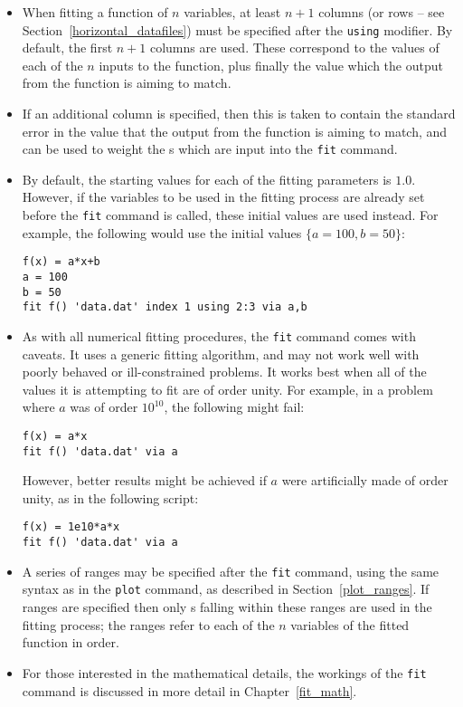 \begin{itemize}
\item When fitting a function of $n$ variables, at least $n+1$ columns (or
rows -- see Section~\ref{horizontal_datafiles}) must be specified after the
{\tt using} modifier. By default, the first $n+1$ columns are used. These
correspond to the values of each of the $n$ inputs to the function, plus
finally the value which the output from the function is aiming to match.
\item If an additional column is specified, then this is taken to contain the
standard error in the value that the output from the function is aiming to
match, and can be used to weight the \datapoint s which are input into the
{\tt fit} command. 
\item By default, the starting values for each of the fitting parameters is
$1.0$. However, if the variables to be used in the fitting process are already
set before the {\tt fit} command is called, these initial values are used
instead. For example, the following would use the initial values
$\{a=100,b=50\}$:
\begin{verbatim}
f(x) = a*x+b
a = 100
b = 50
fit f() 'data.dat' index 1 using 2:3 via a,b
\end{verbatim}

\item As with all numerical fitting procedures, the {\tt fit} command comes
with caveats. It uses a generic fitting algorithm, and may not work well with
poorly behaved or ill-constrained problems. It works best when all of the
values it is attempting to fit are of order unity. For example, in a problem
where $a$ was of order $10^{10}$, the following might fail:
\begin{verbatim}
f(x) = a*x
fit f() 'data.dat' via a
\end{verbatim}
However, better results might be achieved if $a$ were artificially made of
order unity, as in the following script:
\begin{verbatim}
f(x) = 1e10*a*x
fit f() 'data.dat' via a
\end{verbatim}

\item A series of ranges may be specified after the {\tt fit} command, using
the same syntax as in the {\tt plot} command, as described in
Section~\ref{plot_ranges}. If ranges are specified then only \datapoint s falling
within these ranges are used in the fitting process; the ranges refer to each
of the $n$ variables of the fitted function in order.

\item For those interested in the mathematical details, the workings of the
{\tt fit} command is discussed in more detail in Chapter~\ref{fit_math}.

\end{itemize}

